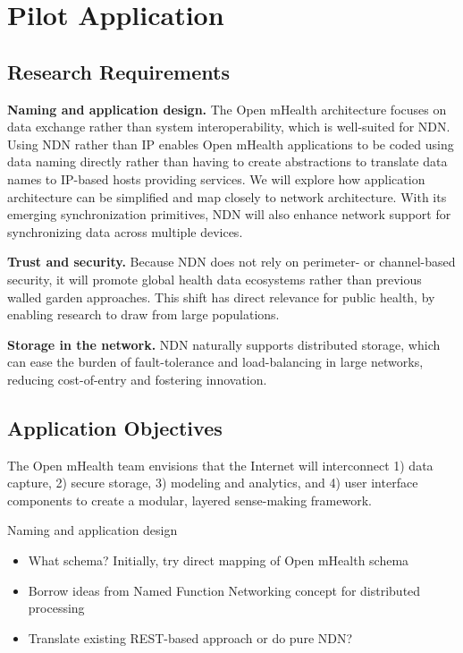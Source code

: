 \section{Pilot Application}


\subsection{Research Requirements} 

{\bf Naming and application design.} The Open mHealth architecture focuses on data exchange rather than system interoperability, which is well-suited for NDN. Using NDN rather than IP enables Open mHealth applications to be coded using data naming directly rather than having to create abstractions to translate data names to IP-based hosts providing services. We will explore how application architecture can be simplified and map closely to network architecture. With its emerging synchronization primitives, NDN will also enhance network support for synchronizing data across multiple devices. 

{\bf Trust and security.} Because NDN does not rely on perimeter- or channel-based security, it will promote global health data ecosystems rather than previous walled garden approaches.   This shift has direct relevance for public health, by enabling research to draw from large populations. 

{\bf Storage in the network.} NDN naturally supports distributed storage, which can ease the burden of fault-tolerance and load-balancing in large networks, reducing cost-of-entry and fostering innovation. 


\subsection{Application Objectives}
The Open mHealth team envisions that the Internet will interconnect 1)
data capture, 2) secure storage, 3) modeling and analytics, and 4) user
interface components to create a modular, layered sense-making framework.  

Naming and application design
\begin{itemize}
\item What schema? Initially, try direct mapping of Open mHealth schema
\item Borrow ideas from Named Function Networking concept for distributed processing
\item Translate existing REST-based approach or do pure NDN? 
\end{itemize}

